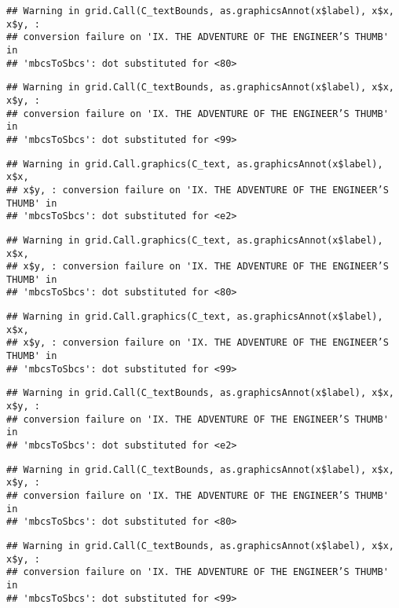 \documentclass[
]{book}
\begin{document}
\begin{verbatim}
## Warning in grid.Call(C_textBounds, as.graphicsAnnot(x$label), x$x, x$y, :
## conversion failure on 'IX. THE ADVENTURE OF THE ENGINEER’S THUMB' in
## 'mbcsToSbcs': dot substituted for <80>
\end{verbatim}

\begin{verbatim}
## Warning in grid.Call(C_textBounds, as.graphicsAnnot(x$label), x$x, x$y, :
## conversion failure on 'IX. THE ADVENTURE OF THE ENGINEER’S THUMB' in
## 'mbcsToSbcs': dot substituted for <99>
\end{verbatim}

\begin{verbatim}
## Warning in grid.Call.graphics(C_text, as.graphicsAnnot(x$label), x$x,
## x$y, : conversion failure on 'IX. THE ADVENTURE OF THE ENGINEER’S THUMB' in
## 'mbcsToSbcs': dot substituted for <e2>
\end{verbatim}

\begin{verbatim}
## Warning in grid.Call.graphics(C_text, as.graphicsAnnot(x$label), x$x,
## x$y, : conversion failure on 'IX. THE ADVENTURE OF THE ENGINEER’S THUMB' in
## 'mbcsToSbcs': dot substituted for <80>
\end{verbatim}

\begin{verbatim}
## Warning in grid.Call.graphics(C_text, as.graphicsAnnot(x$label), x$x,
## x$y, : conversion failure on 'IX. THE ADVENTURE OF THE ENGINEER’S THUMB' in
## 'mbcsToSbcs': dot substituted for <99>
\end{verbatim}

\begin{verbatim}
## Warning in grid.Call(C_textBounds, as.graphicsAnnot(x$label), x$x, x$y, :
## conversion failure on 'IX. THE ADVENTURE OF THE ENGINEER’S THUMB' in
## 'mbcsToSbcs': dot substituted for <e2>
\end{verbatim}

\begin{verbatim}
## Warning in grid.Call(C_textBounds, as.graphicsAnnot(x$label), x$x, x$y, :
## conversion failure on 'IX. THE ADVENTURE OF THE ENGINEER’S THUMB' in
## 'mbcsToSbcs': dot substituted for <80>
\end{verbatim}

\begin{verbatim}
## Warning in grid.Call(C_textBounds, as.graphicsAnnot(x$label), x$x, x$y, :
## conversion failure on 'IX. THE ADVENTURE OF THE ENGINEER’S THUMB' in
## 'mbcsToSbcs': dot substituted for <99>
\end{verbatim}
\end{document}
